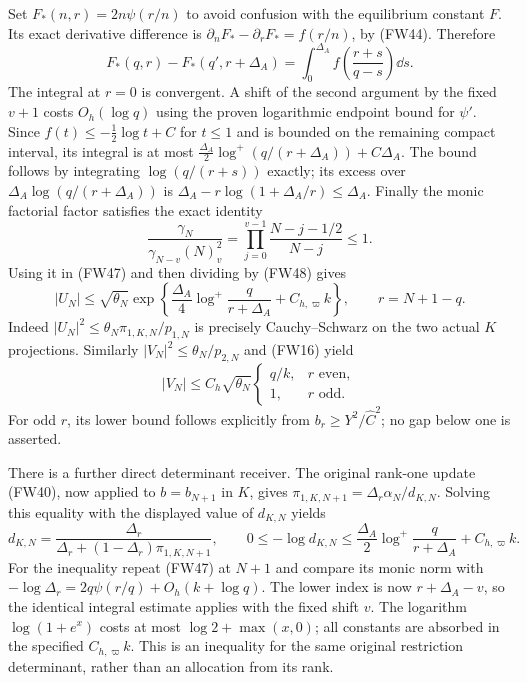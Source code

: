 \documentclass[11pt]{article}
\begin{document}
Set $F_*(n,r)=2n\psi(r/n)$ to avoid confusion with the equilibrium
constant $F$. Its exact derivative difference is
$\partial_nF_*-\partial_rF_*=f(r/n)$, by (FW44). Therefore
\[
 F_*(q,r)-F_*(q',r+\Delta_A)
 =\int_0^{\Delta_A}f\left(\frac{r+s}{q-s}\right)\dd s.
\]
The integral at $r=0$ is convergent. A shift of the second argument
by the fixed $v+1$ costs $O_h(\log q)$ using the proven logarithmic
endpoint bound for $\psi'$. Since $f(t)\le-\frac12\log t+C$
for $t\le1$ and is bounded on the remaining compact interval, its
integral is at most
$\frac{\Delta_A}{2}\log^+(q/(r+\Delta_A))+C\Delta_A$.
The bound follows by integrating $\log(q/(r+s))$ exactly; its excess
over $\Delta_A\log(q/(r+\Delta_A))$ is
$\Delta_A-r\log(1+\Delta_A/r)\le\Delta_A$.
Finally the monic factorial factor satisfies the exact identity
\[
 \frac{\gamma_N}{\gamma_{N-v}(N)_v^2}
       =\prod_{j=0}^{v-1}\frac{N-j-1/2}{N-j}\le1.
\]
Using it in (FW47) and then dividing by (FW48) gives
\begin{equation}\tag{FW49}
 |U_N|\le\sqrt{\theta_N}
 \exp\left\{\frac{\Delta_A}{4}\log^+\frac{q}{r+\Delta_A}
                    +C_{h,\varpi}k\right\},\qquad r=N+1-q.
\end{equation}
Indeed $|U_N|^2\le\theta_N\pi_{1,K,N}/p_{1,N}$ is precisely
Cauchy--Schwarz on the two actual $K$ projections. Similarly
$|V_N|^2\le\theta_N/p_{2,N}$ and (FW16) yield
\begin{equation}\tag{FW50}
 |V_N|\le C_h\sqrt{\theta_N}
 \begin{cases}q/k,&r\text{ even},\\1,&r\text{ odd}.
 \end{cases}
\end{equation}
For odd $r$, its lower bound follows explicitly from
$b_r\ge Y^2/\widehat C^2$; no gap below one is asserted.

There is a further direct determinant receiver. The original rank-one
update (FW40), now applied to $b=b_{N+1}$ in $K$, gives
$\pi_{1,K,N+1}=\Delta_r\alpha_N/d_{K,N}$.
Solving this equality with the displayed value of $d_{K,N}$ yields
\begin{equation}\tag{FW51}
 d_{K,N}=\frac{\Delta_r}{\Delta_r+(1-\Delta_r)\pi_{1,K,N+1}},\qquad
 0\le-\log d_{K,N}
 \le\frac{\Delta_A}{2}\log^+\frac{q}{r+\Delta_A}+C_{h,\varpi}k.
\end{equation}
For the inequality repeat (FW47) at $N+1$ and compare its monic norm
with $-\log\Delta_r=2q\psi(r/q)+O_h(k+\log q)$.
The lower index is now $r+\Delta_A-v$, so the identical integral estimate
applies with the fixed shift $v$. The logarithm $\log(1+e^x)$ costs at
most $\log2+\max(x,0)$; all constants are absorbed in the specified
$C_{h,\varpi}k$. This is an inequality for the same original restriction
determinant, rather than an allocation from its rank.
\end{document}
